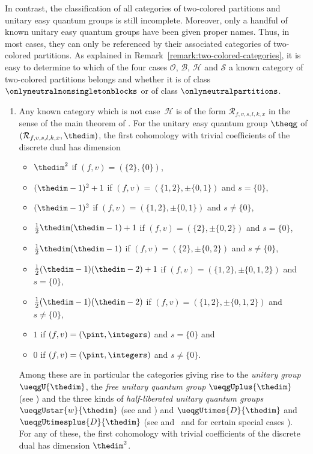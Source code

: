 \documentclass[pdftex]{sigma}
\numberwithin{equation}{section}
\begin{document}
    \begin{Remark}
      In contrast, the classification of all categories of two-colored partitions and unitary easy quantum groups is still incomplete. Moreover, only a handful of known unitary easy quantum groups have been given proper names. Thus, in most cases, they can only be referenced by their associated categories of two-colored partitions.  As explained in Remark~\ref{remark:two-colored-categories}, it is easy to determine to which of the four cases $\mathcal{O}$, $\mathcal{B}$, $\mathcal{H}$ and $\mathcal{S}$ a known category of two-colored partitions belongs and whether it is of class $\onlyneutralnonsingletonblocks$ or of class $\onlyneutralpartitions$.
      \begin{enumerate}
      \item Any known category which is not case~$\mathcal{H}$ is of the form $\mathcal{R}_{f,v,s,l,k,x}$ in the sense of the main theorem of \cite{MangWeber2021b}. For the unitary easy quantum group $\theqg$ of $(\mathcal{R}_{f,v,s,l,k,x},\thedim)$, the first cohomology with trivial coefficients of the discrete dual has dimension
        \begin{itemize}\itemsep=1pt
        \item  $\thedim^2$ if $(f,v)=(\{2\},\{0\})$,
        \item $(\thedim-1)^2+1$ if $(f,v)=(\{1,2\},\pm\{0,1\})$ and $s=\{0\}$,
        \item $(\thedim-1)^2$ if $(f,v)=(\{1,2\},\pm\{0,1\})$ and $s\neq\{0\}$,
        \item $\frac{1}{2}\thedim(\thedim-1)+1$ if $(f,v)=(\{2\},\pm\{0,2\})$ and $s= \{0\}$,
        \item $\frac{1}{2}\thedim(\thedim-1)$ if $(f,v)=(\{2\},\pm\{0,2\})$ and $s\neq \{0\}$,
        \item $\frac{1}{2}(\thedim-1)(\thedim-2)+1$ if $(f,v)=(\{1,2\},\pm\{0,1,2\})$ and $s=\{0\}$,
        \item $\frac{1}{2}(\thedim-1)(\thedim-2)$ if $(f,v)=(\{1,2\},\pm\{0,1,2\})$ and $s\neq \{0\}$,
        \item $1$ if $(f,v)=(\pint,\integers)$ and $s=\{0\}$ and
        \item $0$ if $(f,v)=(\pint,\integers)$ and $s\neq \{0\}$.
        \end{itemize}
Among these are in particular the categories giving rise to the \emph{unitary group} $\ueqgU{\thedim}$, the  \emph{free unitary quantum group} $\ueqgUplus{\thedim}$ (see \cite{VanDaeleWang1996a, Wang1995b}) and the three kinds of \emph{half-liberated unitary quantum groups} $\ueqgUstar{w}{\thedim}$ (see \cite{BanicaBichon2017a,BanicaBichon2017b,MangWeber2020} and \cite[Chapter~3]{Mang2022}) and $\ueqgUtimes{D}{\thedim}$ and $\ueqgUtimesplus{D}{\thedim}$ (see \cite{MangWeber2021a} and~\cite[Chapter~3]{Mang2022} and for certain special cases \cite{BanicaBichon2017a,BhowmickDAndreaDasDabrowski2014, BhowmickDAndreaDabrowski2011}). For any of these, the first cohomology with trivial coefficients of the discrete dual has dimension $\thedim^2$.

\end{enumerate}
\end{Remark}
\end{document}
